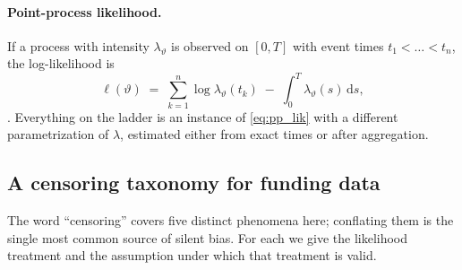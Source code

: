 \documentclass[11pt]{article}
\newcommand{\dd}{\,\mathrm{d}}
\numberwithin{assumption}{section}
\numberwithin{proposition}{section}
\numberwithin{remark}{section}
\begin{document}
\paragraph{Point-process likelihood.} If a process with intensity
$\lambda_\vartheta$ is observed on $[0,T]$ with event times
$t_1<\dots<t_n$, the log-likelihood is
\begin{equation}
\ell(\vartheta)\;=\;\sum_{k=1}^{n}\log\lambda_\vartheta(t_k)
\;-\;\int_0^T \lambda_\vartheta(s)\dd s ,
\label{eq:pp_lik}
\end{equation}
\citep{daleyvj2003,ogata1978}. Everything on the ladder is an instance of
\eqref{eq:pp_lik} with a different parametrization of $\lambda$, estimated
either from exact times or after aggregation.

\subsection{A censoring taxonomy for funding data}
\label{sec:censoring}
The word ``censoring'' covers five distinct phenomena here; conflating them
is the single most common source of silent bias. For each we give the
likelihood treatment and the assumption under which that treatment is valid.
\end{document}
